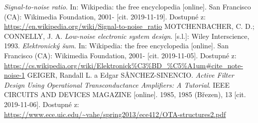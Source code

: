 \begin{thebibliography}{999}
\textit{Signal-to-noise ratio}. In: Wikipedia: the free encyclopedia [online]. San Francisco (CA): Wikimedia Foundation, 2001- [cit. 2019-11-19]. Dostupné z: \url{https://en.wikipedia.org/wiki/Signal-to-noise_ratio}
MOTCHENBACHER, C. D.; CONNELLY, J. A. \textit{Low-noise electronic system design}. [s.l.]: Wiley Interscience, 1993.
\textit{Elektronický šum}. In: Wikipedia: the free encyclopedia [online]. San Francisco (CA): Wikimedia Foundation, 2001- [cit. 2019-11-05]. Dostupné z: \url{https://cs.wikipedia.org/wiki/Elektronick%C3%BD_%C5%A1um#cite_note-noise-1}
GEIGER, Randall L. a Edgar SÂNCHEZ-SINENCIO. \textit{Active Filter Design Using Operational Transconductance Amplifiers: A Tutorial}. IEEE CIRCUITS AND DEVICES MAGAZINE [online]. 1985, 1985 (Březen), 13 [cit. 2019-11-06]. Dostupné z: \url{https://www.ece.uic.edu/~vahe/spring2013/ece412/OTA-structures2.pdf}
\end{thebibliography}
